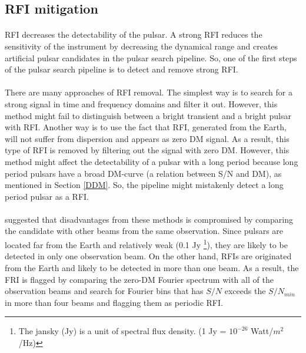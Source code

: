 \documentclass[thesis_msc.tex]{subfiles}
\begin{document}
   \subsection{RFI mitigation} \label{RFI_mit}
        \paragraph{} RFI decreases the detectability of the pulsar. A strong RFI reduces the sensitivity of the instrument by decreasing the dynamical range and creates artificial pulsar candidates in the pulsar search pipeline. So, one of the first steps of the pulsar search pipeline is to detect and remove strong RFI. 
        
        \paragraph{} There are many approaches of RFI removal. The simplest way is to search for a strong signal in time and frequency domains and filter it out. However, this method might fail to distinguish between a bright transient and a bright pulsar with RFI. Another way is to use the fact that RFI, generated from the Earth, will not suffer from dispersion and appears as zero DM signal. As a result, this type of RFI is removed by filtering out the signal with zero DM. However, this method might affect the detectability of a pulsar with a long period because long period pulsars have a broad DM-curve (a relation between S/N and DM), as mentioned in Section \ref{DDM}. So, the pipeline might mistakenly detect a long period pulsar as a RFI. 
        
        \paragraph{} \cite{Ng} suggested that disadvantages from these methods is compromised by comparing the candidate with other beams from the same observation. Since pulsars are located far from the Earth and relatively weak (0.1 Jy \footnote{The jansky (Jy) is a unit of spectral flux density. (1 Jy = $10^{-26}$ Watt/$m^2$/Hz)}), they are likely to be detected in only one observation beam. On the other hand, RFIs are originated from the Earth and likely to be detected in more than one beam. As a result, the FRI is flagged by comparing the zero-DM Fourier spectrum with all of the observation beams and search for Fourier bins that has $S/N$ exceeds the $S/N_{min}$ in more than four beams and flagging them as periodic RFI.     
\end{document}
